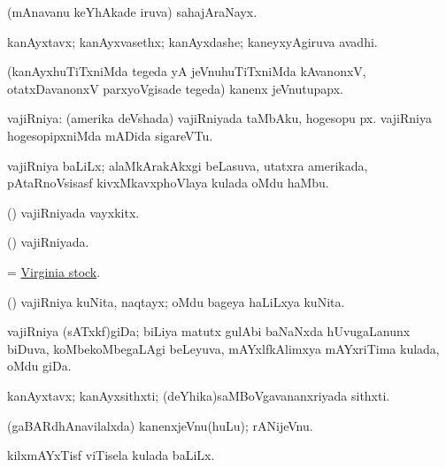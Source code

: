 \bentry
{} 
\gl{\nA}
\expl{}
\bmng
 (mAnavanu keYhAkade iruva) sahajAraNayx. 
\emng
\eentry

\bentry 
{} 
\gl{\nA}
\expl{}
\bmng
 kanAyxtavx; kanAyxvasethx; kanAyxdashe; kaneyxyAgiruva avadhi. 
\emng
\eentry

\bentry 
{}
\gl{\nA}
\expl{}
\bmng
 (kanAyxhuTiTxniMda tegeda yA jeVnuhuTiTxniMda kAvanonxV, otatxDavanonxV parxyoVgisade tegeda) kanenx jeVnutupapx. 
\emng
\eentry

\bentry 
{} 
\gl{\nA}
\expl{}
\bmng
 vajiRniya: 
\banum
{} (amerika deVshada) vajiRniyada taMbAku, hogesopu px. 
 vajiRniya hogesopipxniMda mADida sigareVTu. 
\eanum
\emng
\eentry

\bentry
{}
\gl{\nA}
\expl{}
\bmng
vajiRniya baLiLx; alaMkArakAkxgi beLasuva, utatxra amerikada, pAtaRnoVsisasf kivxMkavxphoVlaya kulada oMdu haMbu. 
\emng
\eentry

\bentry 
{} 
\gl{\nA}
\expl{}
\bmng
 (\ame) vajiRniyada vayxkitx. 
\emng
\eentry

\bentry
{} 
\gl{\gu}
\expl{}
\bmng
 (\ame) vajiRniyada. 
\emng
\eentry

\bentry
{}
\gl{\nA}
\expl{}
\bmng
 = \hyperlink{Virginia stock}{Virginia stock}. 
\emng
\eentry

\bentry
{}
\gl{\nA}
\expl{}
\bmng
 (\ame) vajiRniya kuNita, naqtayx; oMdu bageya haLiLxya kuNita. 
\emng
\eentry

\bentry 
{}
\gl{\nA}
\expl{}
\bmng
 vajiRniya (sATxkf)giDa; biLiya matutx gulAbi baNaNxda hUvugaLanunx biDuva, koMbekoMbegaLAgi beLeyuva, mAYxlfkAlimxya mAYxriTima kulada, oMdu giDa. 
\emng
\eentry

\bentry 
{} 
\gl{\nA}
\expl{}
\bmng
 kanAyxtavx; kanAyxsithxti; (deYhika)saMBoVgavananxriyada sithxti. 
\emng
\eentry

\bentry 
{}
\gl{\nA}
\expl{}
\bmng
 (gaBARdhAnavilalxda) kanenxjeVnu(huLu); rANijeVnu. 
\emng
\eentry

\bentry
{}
\gl{\nA}
\expl{}
\bmng
 kilxmAYxTisf viTisela kulada baLiLx. 
\emng
\eentry


